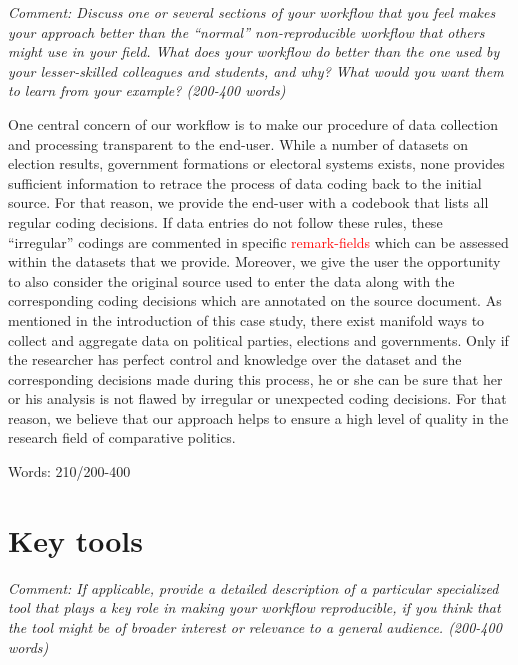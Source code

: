 \documentclass[
  11pt
]{article}
\begin{document}
\textit{Comment: Discuss one or several sections of your workflow that you feel makes your approach better than the ``normal'' non-reproducible workflow that others might use in your field. What does your workflow do better than the one used by your lesser-skilled colleagues and students, and why? What would you want them to learn from your example? (200-400 words)}

\vspace*{1cm}

\noindent
One central concern of our workflow is to make our procedure of data collection and processing transparent to the end-user. While a number of datasets on election results, government formations or electoral systems exists, none provides sufficient information to retrace the process of data coding back to the initial source. For that reason, we provide the end-user with a codebook that lists all regular coding decisions. If data entries do not follow these rules, these ``irregular'' codings are commented in specific \textcolor{red}{remark-fields} which can be assessed within the datasets that we provide. Moreover, we give the user the opportunity to also consider the original source used to enter the data along with the corresponding coding decisions which are annotated on the source document. As mentioned in the introduction of this case study, there exist manifold ways to collect and aggregate data on political parties, elections and governments. Only if the researcher has perfect control and knowledge over the dataset and the corresponding decisions made during this process, he or she can be sure that her or his analysis is not flawed by irregular or unexpected coding decisions. For that reason, we believe that our approach helps to ensure a high level of quality in the research field of comparative politics.

\vspace*{1cm}
\noindent
Words:  210/200-400

\section{Key tools}

\textit{Comment: If applicable, provide a detailed description of a particular specialized tool that plays a key role in making your workflow reproducible, if you think that the tool might be of broader interest or relevance to a general audience. (200-400 words)}

\vspace*{1cm}
\end{document}
